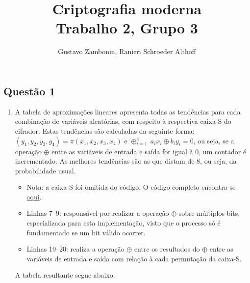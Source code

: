 \documentclass{../sftex/sftex}
\title{Criptografia moderna \\ \small{Trabalho 2, Grupo 3}}
\author{Gustavo Zambonin, Ranieri Schroeder Althoff}
\begin{document}
\maketitle

\subsection*{Questão 1}

\begin{enumerate}

    \item A tabela de aproximações lineares apresenta todas as tendências para
        cada combinação de variáveis aleatórias, com respeito à respectiva
        caixa-S do cifrador. Estas tendências são calculadas da seguinte
        forma: $(y_1, y_2, y_3, y_4) = \pi (x_1, x_2, x_3, x_4)$ e
        $\oplus^{4}_{i=1} \: a_{i}x_{i} \oplus b_{i}y_{i} = 0$, ou seja, se a
        operação $\oplus$ entre as variáveis de entrada e saída for igual à 0,
        um contador é incrementado. As melhores tendências são as que distam
        de 8, ou seja, da probabilidade usual.

    \begin{itemize}

        

        \item Nota: a caixa-S foi omitida do código. O código completo
            encontra-se
            \href{https://raw.githubusercontent.com/zambonin/UFSC-INE5451/master/modern/nl.py}{aqui}.

        \item Linhas 7--9: responsável por realizar a operação $\oplus$ sobre
            múltiplos bits, especializada para esta implementação, visto que o
            processo só é fundamentado se um bit válido ocorrer.

        \item Linhas 19--20: realiza a operação $\oplus$ entre os resultados do
            $\oplus$ entre as variáveis de entrada e saída com relação à cada
            permutação da caixa-S.

    \end{itemize}

    A tabela resultante segue abaixo. \vspace{2mm}


\end{enumerate}
\end{document}
